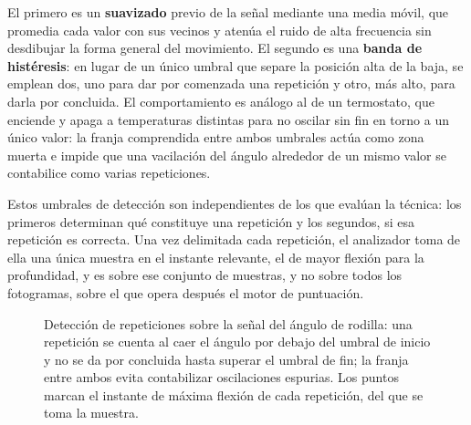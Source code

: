 \documentclass[12pt,a4paper,twoside,openright]{book}
\begin{document}
    El primero es un \textbf{suavizado} previo de la señal mediante una media
    móvil, que promedia cada valor con sus vecinos y atenúa el ruido de alta
    frecuencia sin desdibujar la forma general del movimiento. El segundo es una
    \textbf{banda de histéresis}: en lugar de un único umbral que separe la
    posición alta de la baja, se emplean dos, uno para dar por comenzada una
    repetición y otro, más alto, para darla por concluida. El comportamiento es
    análogo al de un termostato, que enciende y apaga a temperaturas distintas
    para no oscilar sin fin en torno a un único valor: la franja comprendida entre
    ambos umbrales actúa como zona muerta e impide que una vacilación del ángulo
    alrededor de un mismo valor se contabilice como varias repeticiones.

    Estos umbrales de detección son independientes de los que evalúan la técnica:
    los primeros determinan qué constituye una repetición y los segundos, si esa
    repetición es correcta. Una vez delimitada cada repetición, el analizador toma
    de ella una única muestra en el instante relevante, el de mayor flexión para la profundidad,
    y es sobre ese conjunto de muestras, y no sobre todos los fotogramas, sobre el que
    opera después el motor de puntuación.

    \begin{figure}[htbp]
        \centering
        \caption{Detección de repeticiones sobre la señal del ángulo de rodilla:
        una repetición se cuenta al caer el ángulo por debajo del umbral de inicio
        y no se da por concluida hasta superar el umbral de fin; la franja entre
        ambos evita contabilizar oscilaciones espurias. Los puntos marcan el
        instante de máxima flexión de cada repetición, del que se toma la muestra.}
        \label{fig:deteccion-repeticiones}
    \end{figure}
\end{document}
